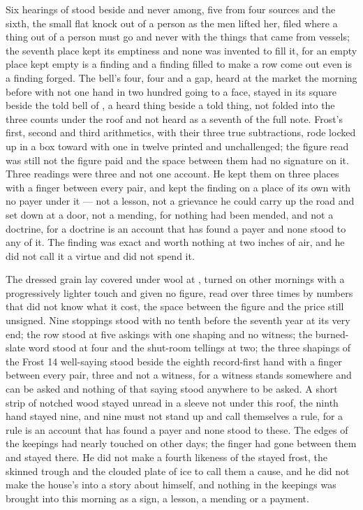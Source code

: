 Six hearings of  stood beside and never among, five from four sources and the sixth, the small flat knock out of a person as the men lifted her, filed where a thing out of a person must go and never with the things that came from vessels; the seventh place kept its emptiness and none was invented to fill it, for an empty place kept empty is a finding and a finding filled to make a row come out even is a finding forged. The bell's four, four and a gap, heard at the market the morning before with not one hand in two hundred going to a face, stayed in its square beside the told bell of , a heard thing beside a told thing, not folded into the three counts under the roof and not heard as a seventh of the full note. Frost's first, second and third arithmetics, with their three true subtractions, rode locked up  in a box toward  with one in twelve printed and unchallenged; the figure read was still not the figure paid and the space between them had no signature on it. Three readings were three and not one account. He kept them on three places with a finger between every pair, and kept the finding on a place of its own with no payer under it --- not a lesson, not a grievance he could carry up the road and set down at a door, not a mending, for nothing had been mended, and not a doctrine, for a doctrine is an account that has found a payer and none stood to any of it. The finding was exact and worth nothing at two inches of air, and he did not call it a virtue and did not spend it.

The dressed grain lay covered under wool at , turned on other mornings with a progressively lighter touch and given no figure, read over three times by numbers that did not know what it cost, the space between the figure and the price still unsigned. Nine stoppings stood with no tenth before the seventh year at its very end; the row stood at five askings with one shaping and no witness; the burned-slate word stood at four and the shut-room tellings at two; the three shapings of the Frost 14 well-saying stood beside the eighth record-first hand with a finger between every pair, three and not a witness, for a witness stands somewhere and can be asked and nothing of that saying stood anywhere to be asked. A short strip of notched wood stayed unread in a sleeve not under this roof, the ninth hand stayed nine, and nine must not stand up and call themselves a rule, for a rule is an account that has found a payer and none stood to these. The edges of the keepings had nearly touched on other days; the finger had gone between them and stayed there. He did not make a fourth likeness of the stayed frost, the skinned trough and the clouded plate of ice to call them a cause, and he did not make the house's  into a story about himself, and nothing in the keepings was brought into this morning as a sign, a lesson, a mending or a payment.

